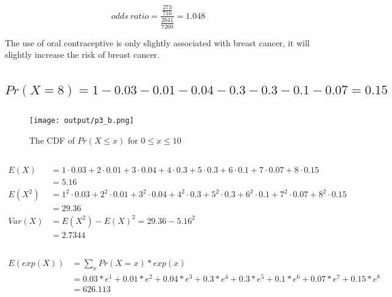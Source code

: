 \documentclass{homework}
\begin{document}
\[
odds\ ratio = \frac{\frac{273}{716}}{\frac{2641}{7260}} = 1.048
\]

The use of oral contraceptive is only slightly associated with breast cancer, it will slightly increase the risk of breast cancer.

\section{}

\subsection{$Pr(X=8) = 1 - 0.03 - 0.01 - 0.04 - 0.3 - 0.3 - 0.1 - 0.07 = 0.15$}

\subsection{}

\begin{figure}[H]
    \centering
    \texttt{[image: output/p3\_b.png]}
    \caption{The CDF of $Pr(X \leq x)$ for $0\leq x\leq 10$}
\end{figure}

\subsection{}

\begin{align*}
E(X) &= 1 \cdot 0.03 + 2 \cdot 0.01 + 3 \cdot 0.04 + 4 \cdot 0.3 + 5 \cdot 0.3 + 6 \cdot 0.1 + 7 \cdot 0.07 + 8 \cdot 0.15 \\
&= 5.16 \\
E(X^2) &= 1^2 \cdot 0.03 + 2^2 \cdot 0.01 + 3^2 \cdot 0.04 + 4^2 \cdot 0.3 + 5^2 \cdot 0.3 + 6^2 \cdot 0.1 + 7^2 \cdot 0.07 + 8^2 \cdot 0.15 \\
&= 29.36 \\
Var(X) &= E(X^2) - E(X)^2 = 29.36 - 5.16^2 \\
&= 2.7344
\end{align*}

\subsection{}

\begin{align*}
    E(exp(X)) &= \sum_x Pr(X=x) * exp(x) \\
    &= 0.03 * e^1 + 0.01 * e^2 + 0.04 * e^3 + 0.3 * e^4 + 0.3 * e^5 + 0.1 * e^6 + 0.07 * e^7 + 0.15 * e^8 \\
    &= 626.113
\end{align*}
\end{document}

